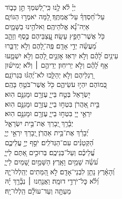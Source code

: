 \documentclass[twoside, openany, parskip=half, 11pt]{book}
\begin{document}
{\begin{narrow}
\\
 יְיָ֗ לֹ֫א לָ֥נוּ \hfill כִּֽי־לְ֭שִׁמְךָ תֵּ֣ן כָּב֑וֹד \\ עַל־חַ֝סְדְּךָ֗ עַל־אֲמִתֶּֽךָ׃  \hfill
 לָ֭מָּה יֹאמְר֣וּ הַגּוֹיִ֑ם\\ אַיֵּה־נָ֗֝א אֱלֹהֵיהֶֽם׃  \hfill
 וֵאלֹהֵ֥ינוּ בַשָּׁמָ֑יִם\\ כֹּ֖ל אֲשֶׁר־חָפֵ֣ץ עָשָֽׂה׃  \hfill
 עֲֽ֭צַבֵּיהֶם כֶּ֣סֶף וְזָהָ֑ב\\ מַ֝עֲשֵׂ֗ה יְדֵ֣י אָדָֽם׃  \hfill
 פֶּֽה־לָ֭הֶם וְלֹ֣א יְדַבֵּ֑רוּ\\ עֵינַ֥יִם לָ֝הֶ֗ם וְלֹ֣א יִרְאֽוּ׃  \hfill
 אׇזְנַ֣יִם לָ֭הֶם וְלֹ֣א יִשְׁמָ֑עוּ\\ אַ֥ף לָ֝הֶ֗ם וְלֹ֣א יְרִיחֽוּן׃  \hfill
 יְדֵיהֶ֤ם ׀ וְלֹ֬א יְמִישׁ֗וּן\\ רַ֭גְלֵיהֶם וְלֹ֣א יְהַלֵּ֑כוּ \hfill לֹא־יֶ֝הְגּ֗וּ בִּגְרוֹנָֽם׃ \\
 כְּ֭מוֹהֶם יִהְי֣וּ עֹשֵׂיהֶ֑ם \hfill כֹּ֖ל אֲשֶׁר־בֹּטֵ֣חַ בָּהֶֽם׃ \\
 יִ֭שְׂרָאֵל בְּטַ֣ח בַּייָ֑ \hfill עֶזְרָ֖ם וּמָגִנָּ֣ם הֽוּא׃ \\
 בֵּ֣ית אַ֭הֲרֹן בִּטְח֣וּ בַייָ֑ \hfill עֶזְרָ֖ם וּמָגִנָּ֣ם הֽוּא׃ \\
 יִרְאֵ֣י יְיָ֭ בִּטְח֣וּ בַייָ֑ \hfill עֶזְרָ֖ם וּמָגִנָּ֣ם הֽוּא׃ \\
 
  יְבָ֫רֵ֥ךְ יְ֭בָרֵךְ \hfill אֶת־בֵּ֣ית יִשְׂרָאֵ֑ל\\ יְ֝בָרֵ֗ךְ אֶת־בֵּ֥ית אַהֲרֹֽן׃  \hfill
 יְ֭בָרֵךְ יִרְאֵ֣י יְיָ֑\\ הַ֝קְּטַנִּ֗ים עִם־הַגְּדֹלִֽים׃  \hfill
 יֹסֵ֣ף יְיָ֣ עֲלֵיכֶ֑ם\\ עֲ֝לֵיכֶ֗ם וְעַל־בְּנֵיכֶֽם׃  \hfill
 בְּרוּכִ֣ים אַ֭תֶּם לַייָ֑\\ עֹ֝שֵׂ֗ה שָׁמַ֥יִם וָאָֽרֶץ׃  \hfill
 הַשָּׁמַ֣יִם שָׁ֭מַיִם לַייָ֑\\ וְ֝הָאָ֗רֶץ נָתַ֥ן לִבְנֵי־אָדָֽם׃  \hfill
 לֹ֣א הַ֭מֵּתִים יְהַֽלְלוּ־יָ֑הּ\\ וְ֝לֹ֗א כׇּל־יֹרְדֵ֥י דוּמָֽה׃  \hfill
 וַאֲנַ֤חְנוּ ׀ נְבָ֘רֵ֤ךְ יָ֗הּ\\ מֵעַתָּ֥ה וְעַד־עוֹלָ֗ם הַֽלְלוּ־יָֽהּ׃  \hfill \break



\end{narrow}}
\end{document}
